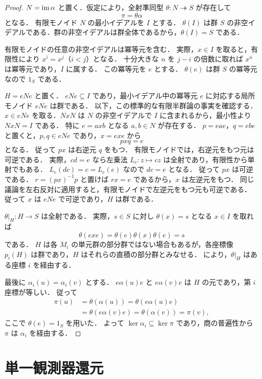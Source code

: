 \begin{proof}
$N=\operatorname{im}\alpha$ と置く．仮定により，全射準同型 $\theta:N\twoheadrightarrow S$ が存在して
\[
\pi=\theta\alpha
\]
となる．
有限モノイド $N$ の最小イデアルを $I$ とする．
$\theta(I)$ は群 $S$ の非空イデアルである．群の非空イデアルは群全体であるから，$\theta(I)=S$ である．

有限モノイドの任意の非空イデアルは冪等元を含む．
実際，$x\in I$ を取ると，有限性により $x^i=x^j$（$i<j$）となる．
十分大きな $n$ を $j-i$ の倍数に取れば $x^n$ は冪等元であり，$I$ に属する．
この冪等元を $e$ とする．
$\theta(e)$ は群 $S$ の冪等元なので $1_S$ である．

$H=eNe$ と置く．
$eNe\subseteq I$ であり，最小イデアル中の冪等元 $e$ に対応する局所モノイド $eNe$ は群である．
以下，この標準的な有限半群論の事実を確認する．
$x\in eNe$ を取る．$NxN$ は $N$ の非空イデアルで $I$ に含まれるから，最小性より $NxN=I$ である．
特に $e=axb$ となる $a,b\in N$ が存在する．
$p=eae$，$q=ebe$ と置くと，$p,q\in eNe$ であり，$x=exe$ から
\[
pxq=e
\]
となる．
従って $px$ は右逆元 $q$ をもつ．
有限モノイドでは，右逆元をもつ元は可逆である．
実際，$cd=e$ なら左乗法 $L_c:z\mapsto cz$ は全射であり，有限性から単射でもある．
$L_c(dc)=c=L_c(e)$ なので $dc=e$ となる．
従って $px$ は可逆である．
$r=(px)^{-1}p$ と置けば $rx=e$ であるから，$x$ は左逆元をもつ．
同じ議論を左右反対に適用すると，有限モノイドで左逆元をもつ元も可逆である．
従って $x$ は $eNe$ で可逆であり，$H$ は群である．

$\theta|_H:H\to S$ は全射である．
実際，$s\in S$ に対し $\theta(x)=s$ となる $x\in I$ を取れば
\[
\theta(exe)=\theta(e)\theta(x)\theta(e)=s
\]
である．
$H$ は各 $M_i$ の単元群の部分群ではない場合もあるが，各座標像 $p_i(H)$ は群であり，$H$ はそれらの直積の部分群とみなせる．
 により，$\theta|_H$ はある座標 $i$ を経由する．

最後に $\alpha_i(u)=\alpha_i(v)$ とする．
$e\alpha(u)e$ と $e\alpha(v)e$ は $H$ の元であり，第 $i$ 座標が等しい．
従って
\[
\begin{aligned}
\pi(u)
 &=\theta(\alpha(u))
  =\theta(e\alpha(u)e)\\
 &=\theta(e\alpha(v)e)
  =\theta(\alpha(v))
  =\pi(v),
\end{aligned}
\]
ここで $\theta(e)=1_S$ を用いた．
よって $\ker\alpha_i\subseteq\ker\pi$ であり，商の普遍性から $\pi$ は $\alpha_i$ を経由する．
\end{proof}

\section{単一観測器還元}

